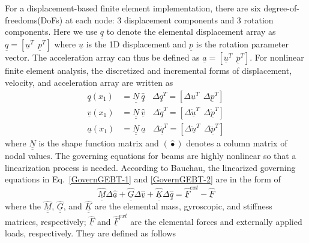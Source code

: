 \documentclass{aiaa-tc}
\newcommand{\tens}[1]{\underline{\underline{#1}}}
\renewcommand{\vec}[1]{\underline{#1}}
\begin{document}
For a displacement-based finite element implementation, there are six
degree-of-freedoms(DoFs) at each node: 3 displacement components and 3
rotation components. Here we use $\vec{q}$ to denote the elemental
displacement array as $\underline{q}=\left[
\underline{u}^T~~\underline{p}^T\right]$ where $\vec{u}$ is the 1D
displacement and $\vec{p}$ is the rotation parameter vector. The
acceleration array can thus be defined as $\underline{a}=\left[
\ddot{\underline{u}}^T~~ \ddot{\underline{p}}^T \right]$. For nonlinear
finite element analysis, the discretized and incremental forms of
displacement, velocity, and acceleration array are written as
\begin{align}
	\label{Discretized}
	\underline{q} (x_1) &= \underline{\underline{N}} ~\hat{\underline{q}}~~~~\Delta \underline{q}^T = \left[ \Delta \underline{u}^T~~\Delta \underline{p}^T \right] \\
	\underline{v}(x_1) &= \underline{\underline{N}}~\hat{\underline{v}}~~~~\Delta \underline{\dot{q}}^T = \left[\Delta \underline{\dot{u}}^T~~\Delta \underline{\dot{p}}^T \right] \\
	\underline{a}(x_1) &= \underline{\underline{N}}~ \hat{\underline{a}}~~~~\Delta \underline{\ddot{q}}^T = \left[ \Delta \ddot{\underline{u}}^T~~\Delta \ddot{\underline{p}}^T \right]	
\end{align}
where $\tens{N}$ is the shape function matrix and $(\hat{\bullet})$ denotes
a column matrix of nodal values.  The governing equations for beams are
highly nonlinear so that a linearization process is needed. According to
Bauchau\cite{Bauchau:2010}, the linearized governing equations in
Eq.~\eqref{GovernGEBT-1} and \eqref{GovernGEBT-2} are in the form of
\begin{equation}
	\label{LinearizedEqn}
	\hat{\underline{\underline{M}}} \Delta \hat{\underline{a}} +\hat{\underline{\underline{G}}} \Delta \hat{\underline{v}}+ \hat{\underline{\underline{K}}} \Delta \hat{\underline{q}} = \hat{\underline{F}}^{ext} - \hat{\underline{F}}
\end{equation} 
where the $\hat{\tens{M}}$, $\hat{\tens{G}}$, and $\hat{\tens{K}}$ are the
elemental mass, gyroscopic, and stiffness matrices, respectively;
$\hat{\vec{F}}$ and $\hat{\vec{F}}^{ext}$ are the elemental forces and
externally applied loads, respectively. They are defined as follows
\end{document}

